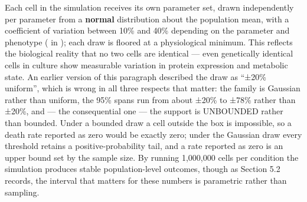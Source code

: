 \documentclass[11pt,twoside,openright]{report}
\begin{document}
Each cell in the simulation receives its own parameter set, drawn independently per parameter from a \textbf{normal} distribution about the population mean, with a coefficient of variation between 10\% and 40\% depending on the parameter and phenotype ( in ); each draw is floored at a physiological minimum. This reflects the biological reality that no two cells are identical --- even genetically identical cells in culture show measurable variation in protein expression and metabolic state. An earlier version of this paragraph described the draw as ``±20\% uniform'', which is wrong in all three respects that matter: the family is Gaussian rather than uniform, the 95\% spans run from about ±20\% to ±78\% rather than ±20\%, and --- the consequential one --- the support is UNBOUNDED rather than bounded. Under a bounded draw a cell outside the box is impossible, so a death rate reported as zero would be exactly zero; under the Gaussian draw every threshold retains a positive-probability tail, and a rate reported as zero is an upper bound set by the sample size. By running 1,000,000 cells per condition the simulation produces stable population-level outcomes, though as Section 5.2 records, the interval that matters for these numbers is parametric rather than sampling.
\end{document}
